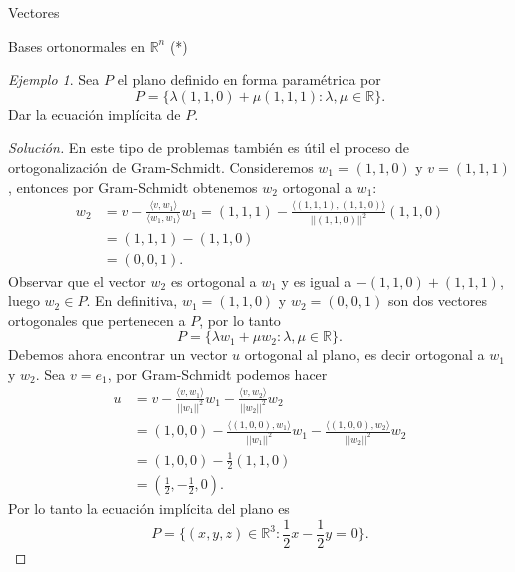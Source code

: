 \documentclass[a4paper,12pt,twoside,spanish,reqno]{amsbook}
\numberwithin{equation}{section}
\theoremstyle{definition}
\theoremstyle{remark}
\newtheorem*{ejemplo*}{Ejemplo}
\newcommand{\la}{\langle}
\newcommand{\ra}{\rangle}
\newcommand{\R}{\mathbb R}
\begin{document}
\begin{chapter}{Vectores}
\begin{section}{Bases ortonormales en $\R^n$ (*)}
\begin{ejemplo*}
    Sea $P$ el plano definido en forma paramétrica por 
    \begin{equation*}
        P = \{\lambda(1,1,0) + \mu(1,1,1): \lambda, \mu \in \R\}.
    \end{equation*}
    Dar la ecuación implícita de $P$.
\end{ejemplo*}
\begin{proof}[Solución]
    En  este tipo de problemas también es útil el proceso de ortogonalización de Gram-Schmidt. Consideremos $w_1 = (1,1,0)$ y $v =(1,1,1)$,  entonces por Gram-Schmidt obtenemos $w_2$ ortogonal a $w_1$:
    \begin{align*}
        w_2 &= v - \frac{\la v,w_1\ra}{\la w_1,w_1\ra}w_1  = (1,1,1) - \frac{\la (1,1,1),(1,1,0)\ra}{||(1,1,0)||^2}(1,1,0) \\
        &=  (1,1,1) - (1,1,0) \\
        &=(0,0,1).
    \end{align*}
    Observar que el vector $w_2$ es ortogonal a $w_1$ y  es igual a  $ - (1,1,0) + (1,1,1)$, luego $w_2 \in P$. En definitiva, $w_1 = (1,1,0)$ y $w_2=(0,0,1)$ son dos vectores ortogonales que pertenecen a $P$, por lo tanto 
    \begin{equation*}
        P = \{\lambda w_1 + \mu w_2: \lambda, \mu \in \R\}.
    \end{equation*}
    Debemos ahora encontrar un vector $u$ ortogonal al plano,  es decir ortogonal a $w_1$ y $w_2$. Sea $v =e_1$, por Gram-Schmidt podemos hacer
    \begin{align*}
        u&= v - \frac{\la v,w_1\ra}{||w_1||^2}w_1- \frac{\la v,w_2\ra}{||w_2||^2}w_2 \\
        &= (1,0,0) - \frac{\la (1,0,0),w_1\ra}{||w_1||^2}w_1- \frac{\la (1,0,0), w_2\ra}{||w_2||^2} w_2\\
        &= (1,0,0) - \frac{1}{2}(1,1,0)  \\
        &= (\frac{1}{2},-\frac{1}{2},0).
       \end{align*}
      Por lo tanto  la ecuación implícita del plano es
      \begin{equation*}
        P = \{(x,y,z)\in \R^3: \frac{1}{2}x-\frac{1}{2}y =0\}.
      \end{equation*}
\end{proof}

 
\end{section}




    \end{chapter}
\end{document}
